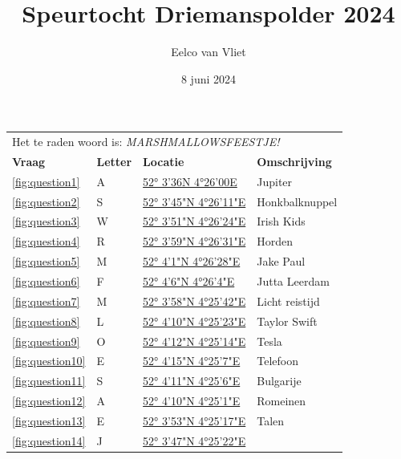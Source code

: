 \documentclass{article}
\title{Speurtocht Driemanspolder 2024}
\author{Eelco van Vliet}
\date{8 juni 2024}
\newcommand{\locone}{52° 3'36N 4°26'00E}
\newcommand{\urlone}{https://forms.gle/88Jf8wcjFSU8aojt8}
\newcommand{\letterone}{A}
\newcommand{\noteone}{Jupiter}
\newcommand{\loctwo}{52° 3'45"N 4°26'11"E}
\newcommand{\urltwo}{https://forms.gle/jwE6WMcVdYzMEdi86}
\newcommand{\lettertwo}{S}
\newcommand{\notetwo}{Honkbalknuppel}
\newcommand{\locthree}{52° 3'51"N 4°26'24"E}
\newcommand{\urlthree}{https://forms.gle/kxh8LWZneB8L2Z3z6}
\newcommand{\letterthree}{W}
\newcommand{\notethree}{Irish Kids}
\newcommand{\locfour}{52° 3'59"N 4°26'31"E}
\newcommand{\urlfour}{https://forms.gle/V9HNHxqCGrrNP5G88}
\newcommand{\letterfour}{R}
\newcommand{\notefour}{Horden}
\newcommand{\locfive}{52° 4'1"N 4°26'28"E}
\newcommand{\urlfive}{https://forms.gle/BCt5xtiF92kuXUrbA}
\newcommand{\letterfive}{M}
\newcommand{\notefive}{Jake Paul}
\newcommand{\locsix}{52° 4'6"N 4°26'4"E}
\newcommand{\urlsix}{https://forms.gle/jiWuTPrYGa8ch47FA}
\newcommand{\lettersix}{F}
\newcommand{\notesix}{Jutta Leerdam}
\newcommand{\locseven}{52° 3'58"N 4°25'42"E}
\newcommand{\urlseven}{ https://forms.gle/ENjzGPWeKBaMmxDN7}
\newcommand{\letterseven}{M}
\newcommand{\noteseven}{Licht reistijd}
\newcommand{\loceight}{52° 4'10"N 4°25'23"E}
\newcommand{\urleight}{https://forms.gle/bpSmFds9fYMj3ThW8}
\newcommand{\lettereight}{L}
\newcommand{\noteeight}{Taylor Swift}
\newcommand{\locnine}{52° 4'12"N 4°25'14"E}
\newcommand{\urlnine}{https://forms.gle/2uKCzoAuqi3J1RTAA}
\newcommand{\letternine}{O}
\newcommand{\notenine}{Tesla}
\newcommand{\locten}{52° 4'15"N   4°25'7"E}
\newcommand{\urlten}{https://forms.gle/9iXk2sc3wtt69EMB7}
\newcommand{\letterten}{E}
\newcommand{\noteten}{Telefoon}
\newcommand{\loceleven}{52° 4'11"N   4°25'6"E}
\newcommand{\urleleven}{https://forms.gle/LuSmoGVzXbCgT9aH8}
\newcommand{\lettereleven}{S}
\newcommand{\noteeleven}{Bulgarije}
\newcommand{\loctwelve}{52° 4'10"N   4°25'1"E}
\newcommand{\urltwelve}{https://forms.gle/ZRpkLsmNRNNmRr127}
\newcommand{\lettertwelve}{A}
\newcommand{\notetwelve}{Romeinen}
\newcommand{\locthirteen}{52° 3'53"N   4°25'17"E}
\newcommand{\urlthirteen}{https://forms.gle/AbXUfJAjqyAwxBBW7}
\newcommand{\letterthirteen}{E}
\newcommand{\notethirteen}{Talen}
\newcommand{\locfourteen}{52° 3'47"N   4°25'22"E}
\newcommand{\urlfourteen}{https://example.com}
\newcommand{\letterfourteen}{J}
\newcommand{\notefourteen}{}
\begin{document}
    \maketitle
        \begin{tabular}{llll}
            \toprule
            \multicolumn{4}{l}{Het te raden woord is: \emph{MARSHMALLOWSFEESTJE!}} \\
            \textbf{Vraag} & \textbf{Letter} & \textbf{Locatie} & \textbf{Omschrijving} \\
            \midrule
             \ref{fig:question1} & \letterone & \href{\urlone}{\locone} & \noteone \\
            \ref{fig:question2} & \lettertwo & \href{\urltwo}{\loctwo} & \notetwo \\
            \ref{fig:question3} & \letterthree & \href{\urlthree}{\locthree} & \notethree  \\
            \ref{fig:question4} & \letterfour  & \href{\urlfour}{\locfour} & \notefour \\
            \ref{fig:question5} & \letterfive  & \href{\urlfive}{\locfive} & \notefive \\
            \ref{fig:question6} & \lettersix  & \href{\urlsix}{\locsix} & \notesix \\
            \ref{fig:question7} & \letterseven  & \href{\urlseven}{\locseven} & \noteseven \\
            \ref{fig:question8} & \lettereight  & \href{\urleight}{\loceight} & \noteeight \\
            \ref{fig:question9} & \letternine  & \href{\urlnine}{\locnine} & \notenine \\
            \ref{fig:question10} & \letterten  & \href{\urlten}{\locten} & \noteten \\
            \ref{fig:question11} & \lettereleven  & \href{\urleleven}{\loceleven} & \noteeleven \\
            \ref{fig:question12} & \lettertwelve  & \href{\urltwelve}{\loctwelve} & \notetwelve \\
            \ref{fig:question13} & \letterthirteen  & \href{\urlthirteen}{\locthirteen} & \notethirteen \\
            \ref{fig:question14} & \letterfourteen  & \href{\urlfourteen}{\locfourteen} & \notefourteen \\

\end{tabular}
\end{document}
